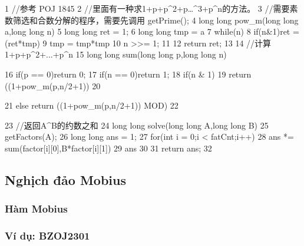 \documentclass[11pt]{article}
\begin{document}
\begin{Code}
 1   //参考 POJ 1845
 2   //里面有一种求1+p+p^2+p…^3+p^n的方法。
 3   //需要素数筛选和合数分解的程序，需要先调用 getPrime();
 4   long long pow_m(long long a,long long n){
 5       long long ret = 1;
 6       long long tmp = a%
 7       while(n){
 8           if(n&1)ret = (ret*tmp)%
 9           tmp = tmp*tmp%
10           n >>= 1;
11       }
12       return ret;
13   }
14   //计算1+p+p^2+...+p^n
15   long long sum(long long p,long long n){
16       if(p == 0)return 0;
17       if(n == 0)return 1;
18       if(n & 1){
19           return ((1+pow_m(p,n/2+1))%
20       }


21       else return ((1+pow_m(p,n/2+1))%
            MOD)%
22   }
23   //返回A^B的约数之和 %
24   long long solve(long long A,long long B){
25       getFactors(A);
26       long long ans = 1;
27       for(int i = 0;i < fatCnt;i++){
28           ans *= sum(factor[i][0],B*factor[i][1])%
29           ans %
30       }
31       return ans;
32   }
\end{Code}

\subsection{Nghịch đảo Mobius}

\subsubsection{Hàm Mobius}


\subsubsection{Ví dụ: BZOJ2301}
\end{document}
